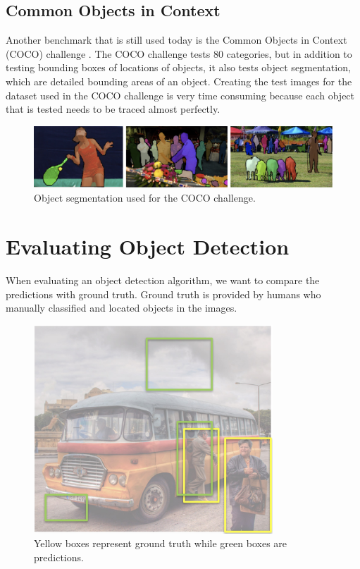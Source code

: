 \documentclass{article}
\begin{document}
\subsection{Common Objects in Context}
Another benchmark that is still used today is the Common Objects in Context (COCO) challenge \cite{DBLP:journals/corr/LinMBHPRDZ14}. The COCO challenge tests 80 categories, but in addition to testing bounding boxes of locations of objects, it also tests object segmentation, which are detailed bounding areas of an object. Creating the test images for the dataset used in the COCO challenge is very time consuming because each object that is tested needs to be traced almost perfectly.

\begin{figure}[h]
	\includegraphics[width=\textwidth]{coco.png}
    \caption{Object segmentation used for the COCO challenge.}
\end{figure}

\pagebreak

\section{Evaluating Object Detection}

When evaluating an object detection algorithm, we want to compare the predictions with ground truth. Ground truth is provided by humans who manually classified and located objects in the images.

\begin{figure}[ht]
\centering
	\includegraphics[width=0.8\textwidth]{predict_truth.jpg}
    \caption{Yellow boxes represent ground truth while green boxes are predictions.}
\end{figure}
\end{document}

